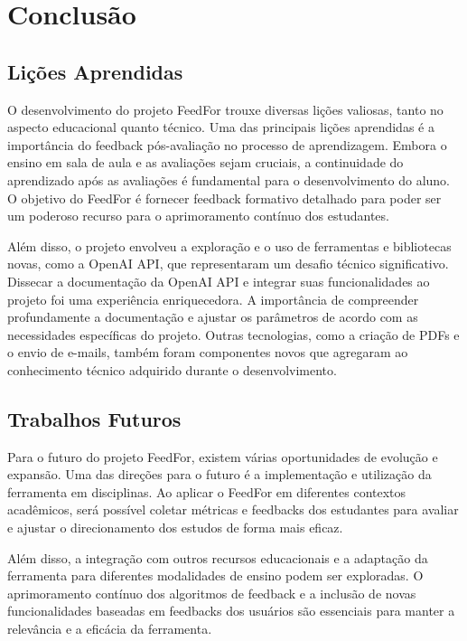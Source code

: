 \chapter{Conclusão}

\section{Lições Aprendidas}

O desenvolvimento do projeto FeedFor trouxe diversas lições valiosas, tanto no aspecto educacional quanto técnico. Uma das principais lições aprendidas é a importância do feedback pós-avaliação no processo de aprendizagem. Embora o ensino em sala de aula e as avaliações sejam cruciais, a continuidade do aprendizado após as avaliações é fundamental para o desenvolvimento do aluno. O objetivo do FeedFor é fornecer feedback formativo detalhado para poder ser um poderoso recurso para o aprimoramento contínuo dos estudantes.

Além disso, o projeto envolveu a exploração e o uso de ferramentas e bibliotecas novas, como a OpenAI API, que representaram um desafio técnico significativo. Dissecar a documentação da OpenAI API e integrar suas funcionalidades ao projeto foi uma experiência enriquecedora. A importância de compreender profundamente a documentação e ajustar os parâmetros de acordo com as necessidades específicas do projeto. Outras tecnologias, como a criação de PDFs e o envio de e-mails, também foram componentes novos que agregaram ao conhecimento técnico adquirido durante o desenvolvimento.

\section{Trabalhos Futuros}

Para o futuro do projeto FeedFor, existem várias oportunidades de evolução e expansão. Uma das direções para o futuro é a implementação e utilização da ferramenta em disciplinas. Ao aplicar o FeedFor em diferentes contextos acadêmicos, será possível coletar métricas e feedbacks dos estudantes para avaliar e ajustar o direcionamento dos estudos de forma mais eficaz.

Além disso, a integração com outros recursos educacionais e a adaptação da ferramenta para diferentes modalidades de ensino podem ser exploradas. O aprimoramento contínuo dos algoritmos de feedback e a inclusão de novas funcionalidades baseadas em feedbacks dos usuários são essenciais para manter a relevância e a eficácia da ferramenta.

